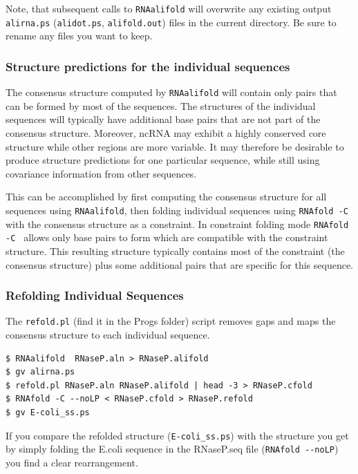 \documentclass[a4paper]{article}
\newcommand{\frametitle}[1]{\subsubsection{#1}}
\begin{document}
Note, that subsequent calls to \texttt{RNAalifold} will overwrite any
existing output \texttt{alirna.ps} (\texttt{alidot.ps},
\texttt{alifold.out}) files in the current directory. Be sure to
rename any files you want to keep.

\subsubsection{Structure predictions for the individual sequences}

The consensus structure computed by \texttt{RNAalifold} will contain only
pairs that can be formed by most of the sequences. The structures of the
individual sequences will typically have additional base pairs that are not
part of the consensus structure. Moreover, ncRNA may exhibit a highly
conserved core structure while other regions are more variable. It may
therefore be desirable to produce structure predictions for one particular
sequence, while still using covariance information from other sequences.

This can be accomplished by first computing the consensus structure for all
sequences using \texttt{RNAalifold}, then folding individual sequences using
\texttt{RNAfold -C\,} with the consensus structure as a constraint. In
constraint folding mode \texttt{RNAfold -C\,} allows only base pairs to form
which are compatible with the constraint structure. This resulting
structure typically contains most of the constraint (the consensus
structure)  plus some additional pairs that are specific for this sequence.

\frametitle{Refolding Individual Sequences}
The \texttt{refold.pl} (find it in the Progs folder) script removes gaps and maps the consensus structure to
each individual sequence.
\begin{scriptsize}
\begin{small}
\begin{verbatim}
$ RNAalifold  RNaseP.aln > RNaseP.alifold
$ gv alirna.ps
$ refold.pl RNaseP.aln RNaseP.alifold | head -3 > RNaseP.cfold
$ RNAfold -C --noLP < RNaseP.cfold > RNaseP.refold
$ gv E-coli_ss.ps
\end{verbatim} %
\end{small}
\end{scriptsize}

If you compare the refolded structure (\verb+E-coli_ss.ps+) with the
structure you get by simply folding the E.coli sequence in the
RNaseP.seq file (\verb+RNAfold --noLP+) you find a clear
rearrangement.
\end{document}
